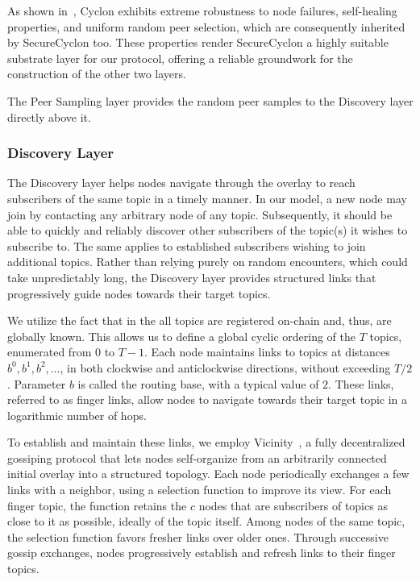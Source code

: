 As shown in~\cite{Cyclon}, Cyclon exhibits extreme robustness to node failures, self-healing properties, and uniform random peer selection, which are consequently inherited by SecureCyclon too.
These properties render SecureCyclon a highly suitable substrate layer for our protocol, offering a reliable groundwork for the construction of the other two layers.

The Peer Sampling layer provides the random peer samples to the Discovery layer directly above it.

\subsubsection{Discovery Layer}
\label{ subsubsec:discovery-layer}

The Discovery layer helps nodes navigate through the overlay to reach subscribers of the same topic in a timely manner.
In our model, a new node may join by contacting any arbitrary node of any topic.
Subsequently, it should be able to quickly and reliably discover other subscribers of the topic(s) it wishes to subscribe to.
The same applies to established subscribers wishing to join additional topics.
Rather than relying purely on random encounters, which could take unpredictably long, the Discovery layer provides structured links that progressively guide nodes towards their target topics.

We utilize the fact that in the \system all topics are registered on-chain and, thus, are globally known.
This allows us to define a global cyclic ordering of the $T$ topics, enumerated from $0$ to $T-1$.
Each node maintains links to topics at distances $b^0, b^1, b^2, \ldots$, in both clockwise and anticlockwise directions, without exceeding $T/2$.
Parameter $b$ is called the routing base, with a typical value of $2$.
These links, referred to as finger links, allow nodes to navigate towards their target topic in a logarithmic number of hops.

To establish and maintain these links, we employ Vicinity~\cite{Vicinity}, a fully decentralized gossiping protocol that lets nodes self-organize from an arbitrarily connected initial overlay into a structured topology.
Each node periodically exchanges a few links with a neighbor, using a selection function to improve its view.
For each finger topic, the function retains the $c$ nodes that are subscribers of topics as close to it as possible, ideally of the topic itself.
Among nodes of the same topic, the selection function favors fresher links over older ones.
Through successive gossip exchanges, nodes progressively establish and refresh links to their finger topics.


